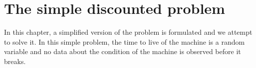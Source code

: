 


\chapter{The simple discounted problem}
In this chapter, a simplified version of the problem is formulated and we attempt to solve it. In this simple problem, the time to live of the machine is a random variable and no data about the condition of the machine is observed before it breaks.


